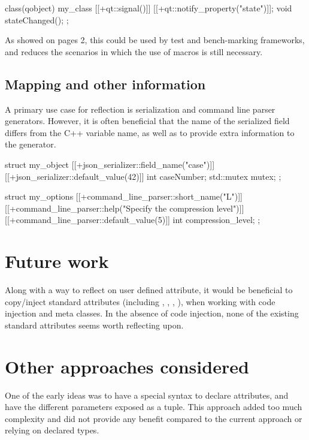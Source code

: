 \documentclass{wg21}
\begin{document}
\begin{colorblock}
class(qobject) my_class {
    [[+qt::signal()]]
    [[+qt::notify_property("state")]]; 
    void stateChanged();
};

\end{colorblock}

As showed on pages 2, this could be used by test and bench-marking frameworks, and reduces the scenarios in which the use of macros
is still necessary.


\subsection{Mapping and other information}

A primary use case for reflection is serialization and command line parser generators.
However, it is often beneficial that the name of the serialized field differs from the C++ variable name, as well as to provide extra information to the generator.

\begin{colorblock}
struct my_object {
    [[+json_serializer::field_name("case")]]
    [[+json_serializer::default_value(42)]]
    int caseNumber;
    std::mutex mutex;
};
\end{colorblock}


\begin{colorblock}
struct my_options {
    [[+command_line_parser::short_name("L")]]
    [[+command_line_parser::help("Specify the compression level")]]
    [[+command_line_parser::default_value(5)]]
    int compression_level;
};
\end{colorblock}

\section{Future work}

Along with a way to reflect on user defined attribute, it would be beneficial to copy/inject
standard attributes (including , , , ),
when working with code injection and meta classes.
In the absence of code injection, none of the existing standard attributes seems worth reflecting upon.


\section{Other approaches considered}

One of the early ideas was to have a special syntax to declare attributes, and have the different parameters exposed as a tuple.
This approach added too much complexity and did not provide any benefit compared to the current approach or relying on declared types. 
\end{document}
